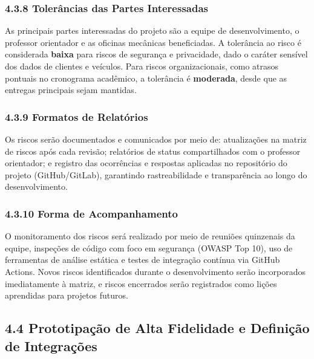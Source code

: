 \documentclass[12pt, a4paper]{article}
\begin{document}
\subsubsection*{4.3.8 Toler\^ancias das Partes Interessadas}
 
As principais partes interessadas do projeto s\~ao a equipe de desenvolvimento, o professor
orientador e as oficinas mec\^anicas beneficiadas. A toler\^ancia ao risco \'e considerada
\textbf{baixa} para riscos de seguran\c{c}a e privacidade, dado o car\'ater sens\'ivel dos
dados de clientes e ve\'iculos. Para riscos organizacionais, como atrasos pontuais no
cronograma acad\^emico, a toler\^ancia \'e \textbf{moderada}, desde que as entregas principais
sejam mantidas.
 
\subsubsection*{4.3.9 Formatos de Relat\'orios}
 
Os riscos ser\~ao documentados e comunicados por meio de: atualiza\c{c}\~oes na matriz de
riscos ap\'os cada revis\~ao; relat\'orios de status compartilhados com o professor orientador;
e registro das ocorr\^encias e respostas aplicadas no reposit\'orio do projeto (GitHub/GitLab),
garantindo rastreabilidade e transpar\^encia ao longo do desenvolvimento.
 
\subsubsection*{4.3.10 Forma de Acompanhamento}
 
O monitoramento dos riscos ser\'a realizado por meio de reuni\~oes quinzenais da equipe,
inspe\c{c}\~oes de c\'odigo com foco em seguran\c{c}a (OWASP Top 10), uso de ferramentas
de an\'alise est\'atica e testes de integra\c{c}\~ao cont\'inua via GitHub Actions. Novos
riscos identificados durante o desenvolvimento ser\~ao incorporados imediatamente \`a matriz,
e riscos encerrados ser\~ao registrados como li\c{c}\~oes aprendidas para projetos futuros.


\subsection*{4.4 Prototipa\c{c}\~ao de Alta Fidelidade e Defini\c{c}\~ao de Integrações}
\end{document}
